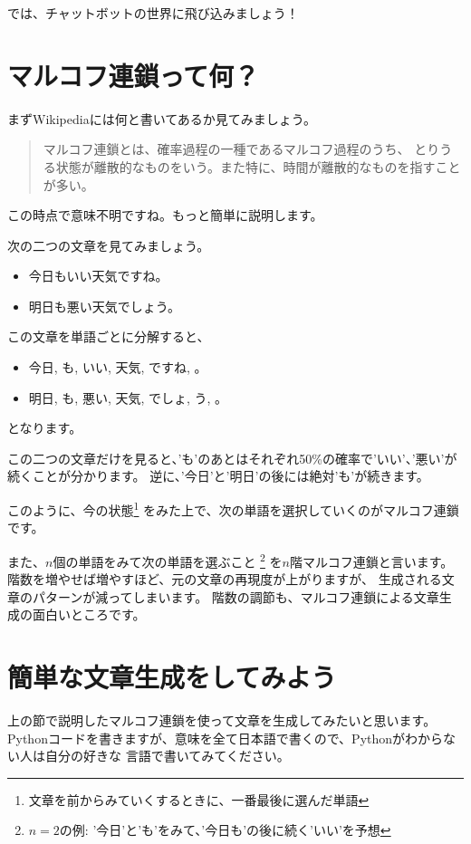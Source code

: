 \documentclass{jsarticle}
\begin{document}
        では、チャットボットの世界に飛び込みましょう！

    \section*{マルコフ連鎖って何？}
        まずWikipediaには何と書いてあるか見てみましょう。

        \begin{quote}
            マルコフ連鎖とは、確率過程の一種であるマルコフ過程のうち、
            とりうる状態が離散的なものをいう。また特に、時間が離散的なものを指すことが多い。
        \end{quote}

        この時点で意味不明ですね。もっと簡単に説明します。

        次の二つの文章を見てみましょう。

        \begin{itemize}
            \item 今日もいい天気ですね。
            \item 明日も悪い天気でしょう。
        \end{itemize}

        この文章を単語ごとに分解すると、
        
        \begin{itemize}
            \item 今日, も, いい, 天気, ですね, 。
            \item 明日, も, 悪い, 天気, でしょ, う, 。
        \end{itemize}

        となります。

        この二つの文章だけを見ると、'も'のあとはそれぞれ50\%の確率で'いい'、'悪い'が続くことが分かります。
        逆に、'今日'と'明日'の後には絶対'も'が続きます。

        このように、今の状態\footnote{文章を前からみていくするときに、一番最後に選んだ単語}
        をみた上で、次の単語を選択していくのがマルコフ連鎖です。

        また、$n$個の単語をみて次の単語を選ぶこと
        \footnote{$n=2$の例: '今日'と'も'をみて、'今日も'の後に続く'いい'を予想}
        を$n$階マルコフ連鎖と言います。
        階数を増やせば増やすほど、元の文章の再現度が上がりますが、
        生成される文章のパターンが減ってしまいます。
        階数の調節も、マルコフ連鎖による文章生成の面白いところです。
    
    \section*{簡単な文章生成をしてみよう}
        上の節で説明したマルコフ連鎖を使って文章を生成してみたいと思います。
        Pythonコードを書きますが、意味を全て日本語で書くので、Pythonがわからない人は自分の好きな
        言語で書いてみてください。
\end{document}
